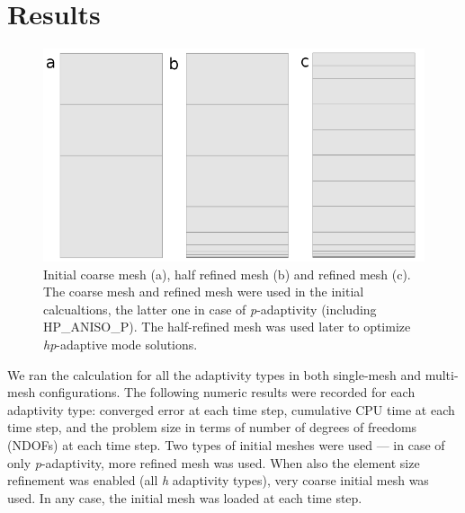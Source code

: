 \section{Results}

\begin{figure}
  \begin{centering}
  \includegraphics[width=.8\columnwidth]{mesh}
  \caption{\label{fig:mesh} Initial coarse mesh (a),
  	half refined mesh (b) and refined mesh (c). The coarse mesh
	and refined mesh were used in the initial calcualtions, the latter one
	in case of \emph{p}-adaptivity (including HP\_ANISO\_P). The half-refined mesh was
	used later to optimize \emph{hp}-adaptive mode solutions.}
  \end{centering}
\end{figure}
We ran the calculation for all the adaptivity types 
in both single-mesh and multi-mesh configurations. 
The following numeric results were recorded for each 
adaptivity type: converged error at each time step, cumulative CPU
time at each time step, and the problem size in terms of number
of degrees of freedoms (NDOFs) at each time step.  
Two types of initial meshes were used --- in case of only \emph{p}-adaptivity,
more refined mesh was used. When also the element size refinement
was enabled (all \emph{h} adaptivity types), very coarse initial mesh
was used. In any case, the initial mesh was loaded at each time step.

